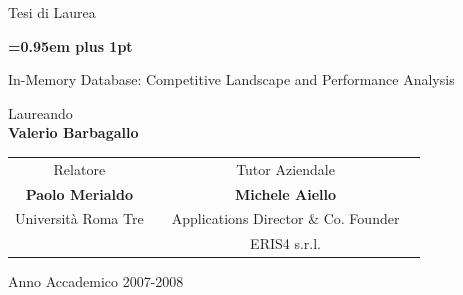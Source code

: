 \begin{titlepage}
\begin{center}
        {\LARGE{Tesi di Laurea}\par}
\end{center}

\vspace{0.5cm}
\begin{center}
        {\huge\bf \baselineskip=0.95em plus 1pt \expandafter{
In-Memory Database: Competitive Landscape and Performance Analysis
        \par}}
\end{center}

\vspace{1cm}
\begin{center}
        {\rm{Laureando}}\\
        {\large\textbf{Valerio Barbagallo}}
\end{center}



\vspace{0.5cm}

\begin{tabular}{c p{3.3cm}c c}



Relatore & & Tutor Aziendale \\
\textbf{Paolo Merialdo} & & \textbf{Michele Aiello}\\
{\small Universit\`a Roma Tre} & & {\small Applications Director \& Co. Founder}\\
& & ERIS4 s.r.l.\\
\end{tabular}
\vspace{1.5 cm}



\vspace{0.5cm}
\begin{center}
\large{Anno Accademico 2007-2008}
\end{center}
\par
\vfill\par 
\clearpage
\endgroup
\end{titlepage}
